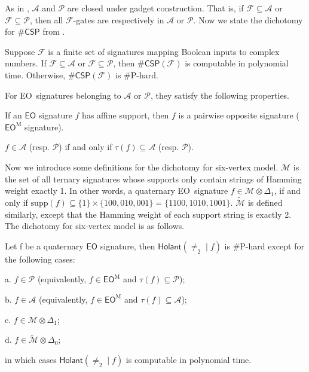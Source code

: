 \documentclass[a4paper,UKenglish,cleveref, autoref, thm-restate]{lipics-v2021}
\newcommand{\hol}[0]{\textsf{Holant}}
\newcommand{\eo}[0]{\textsf{EO}}
\newcommand{\csp}[0]{\textsf{CSP}}
\newcommand{\su}[0]{\text{supp}}
\newcommand{\eom}[1][\text{M}]{\textsf{EO}^{#1}}
\begin{document}
As in \cite[chapter 3]{cai2017complexity}, $\mathscr{A}$ and $\mathscr{P}$ are closed under gadget construction. That is, if $\mathcal{F}\subseteq\mathscr{A}$ or $\mathcal{F}\subseteq\mathscr{P}$, then all $\mathcal{F}$-gates are respectively in $\mathscr{A}$ or $\mathscr{P}$. Now we state the dichotomy for $\#\csp$ from \cite[Theorem 3.1]{cai2014complexity}.

\begin{theorem}\label{thm:CSPdichotomy}
Suppose $\mathcal{F}$ is a finite set of signatures mapping Boolean inputs to complex numbers. If $\mathcal{F}\subseteq\mathscr{A}$ or $\mathcal{F}\subseteq\mathscr{P}$, then $\#\csp(\mathcal{F})$ is computable in polynomial time. Otherwise, $\#\csp(\mathcal{F})$ is \#P-hard.
\end{theorem}

For \eo\ signatures belonging to $\mathscr{A}$ or $\mathcal{P}$, they satisfy the following properties. 
\begin{lemma}  \label{lem: eo+affine= eom}
If an $\eo$ signature $f$ has affine support, then $f$ is a pairwise opposite signature ($\eom$ signature). 
\end{lemma}
\begin{lemma}
    $f\in\mathscr{A}$ (resp. $\mathscr{P}$) if and only if $\tau(f)\subseteq  \mathscr{A}$ (resp. $\mathscr{P}$).
\end{lemma}

Now we introduce some definitions for the dichotomy for six-vertex model. $\mathscr{M}$ is the set of all ternary signatures whose supports only contain strings of Hamming weight exactly 1. In other words, a quaternary \eo\ signature $f\in \mathscr{M} \otimes \Delta_1 $, if and only if $\su(f) \subseteq \{1\} \times \{100,010,001\}=\{1100,1010,1001\}$. $\widetilde{\mathscr{M}}$ is defined similarly, except that the Hamming weight of each support string is exactly 2. The dichotomy for six-vertex model is as follows. 

\begin{theorem} \label{thm:sixvertexdichotomyMform}
    Let f be a quaternary $\eo$ signature, then $\hol(\neq_2\mid f)$ is \#P-hard except for the following cases:

a. $f\in\mathscr{P}$ (equivalently, $f \in \eom$ and $\tau(f) \subseteq \mathscr{P}$);

b. $f\in\mathscr{A}$ (equivalently, $f \in \eom$ and $\tau(f) \subseteq \mathscr{A}$);

c. $f\in \mathscr{M}\otimes  \Delta_1 $;

d. $f\in  \widetilde{ \mathscr{M}} \otimes  \Delta_0$;

in which cases $\hol(\neq_2\mid f)$ is computable in polynomial time.
\end{theorem}
\end{document}
